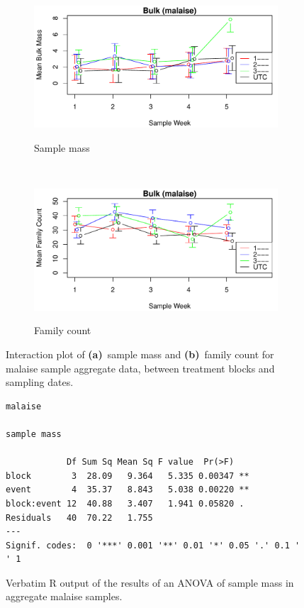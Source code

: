 \documentclass[10pt,letterpaper,twocolumn]{article}
\begin{document}
\begin{figure}[h]
	\centering
	\begin{subfigure}[b]{0.45\textwidth}
		\caption{Sample mass}
		\includegraphics[width=\textwidth]{plots/bulk/2015_mass_malaise_interplot.pdf}
		\label{fig:bulk_malaise_mass_interplot}
	\end{subfigure}
	~
	\begin{subfigure}[b]{0.45\textwidth}
		\caption{Family count}
		\includegraphics[width=\textwidth]{plots/bulk/2015_family_malaise_interplot.pdf}
		\label{fig:bulk_malaise_family_interplot}
	\end{subfigure}
	\caption{Interaction plot of \textbf{(a)}~sample mass and \textbf{(b)}~family count for malaise sample aggregate data, between treatment blocks and sampling dates.}
	\label{fig:bulk_malaise_interplot}
	\smallskip
	\nointerlineskip
	\hrulefill
\end{figure}

\begin{figure}[h]
	\lstset{numbers=left}
	\lstset{xleftmargin=5mm,framexleftmargin=5mm}
	\begin{lstlisting}
malaise 

sample mass 

            Df Sum Sq Mean Sq F value  Pr(>F)   
block        3  28.09   9.364   5.335 0.00347 **
event        4  35.37   8.843   5.038 0.00220 **
block:event 12  40.88   3.407   1.941 0.05820 . 
Residuals   40  70.22   1.755                   
---
Signif. codes:  0 '***' 0.001 '**' 0.01 '*' 0.05 '.' 0.1 ' ' 1
	\end{lstlisting}
	\caption{Verbatim R output of the results of an ANOVA of sample mass in aggregate malaise samples.}
	\label{fig:bulk_malaise_mass_anova}
	\smallskip
	\nointerlineskip
	\hrulefill
\end{figure}
\end{document}
